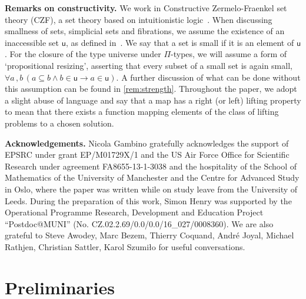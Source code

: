 \documentclass[reqno,10pt,a4paper,oneside,draft]{amsart}
\begin{document}
\smallskip

\noindent
\textbf{Remarks on constructivity.} We work in  Constructive Zermelo-Fraenkel set theory (CZF),
a set theory based on intuitionistic logic~\cite{AczelP:typtic-I}. When discussing smallness of sets,
simplicial sets and fibrations, we assume the existence of an inaccessible set $\mathsf{u}$, as defined 
in~\cite[Definition~18.1.2]{AczelP:notcst}. We say that a set is small if it is an element of $\mathsf{u}$.
For the closure of the type universe under $\Pi$-types, we will assume a form of `propositional resizing', asserting that every subset 
of a small set is again small, \ie  $\forall a \, , b \,  ( a \subseteq b \land b \in \mathsf{u} \rightarrow a \in \mathsf{u} )$.  A further discussion of what can be done without this assumption can be found in \cref{rem:strength}. Throughout the paper, we adopt a slight abuse of language and say that a map has a right (or left) lifting property to mean that there exists a function mapping elements of the class of lifting problems to a chosen solution. 


\smallskip

\noindent 
\textbf{Acknowledgements.} Nicola Gambino gratefully acknowledges the support of
EPSRC under grant EP/M01729X/1 and the US Air Force Office for Scientific Research under 
agreement FA8655-13-1-3038 and the hospitality of the 
School of Mathematics of the University of Manchester and the Centre for Advanced Study in Oslo,
where the paper was written while on study leave from the University of Leeds. During the preparation of this work, Simon Henry was supported by the Operational Programme Research, Development and Education Project ``Postdoc@MUNI'' (No. CZ.02.2.69/0.0/0.0/16\_027/0008360). We are also grateful to Steve Awodey, Marc Bezem, Thierry Coquand, Andr\'e Joyal, Michael Rathjen, Christian Sattler, Karol Szumi{\l}o  for useful conversations. 






\section{Preliminaries} 
\label{sec:preliminaries}
\end{document}
